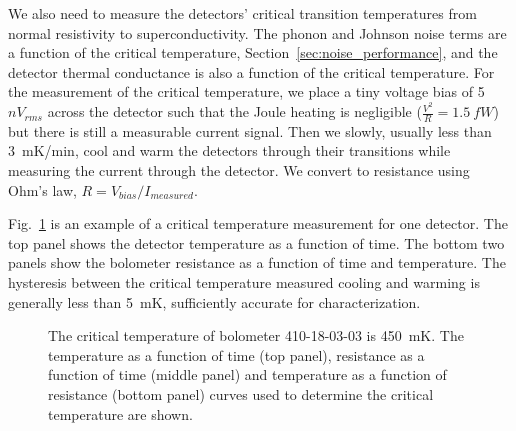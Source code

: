 We also need to measure the detectors' critical transition temperatures from normal resistivity to superconductivity. 
The phonon and Johnson noise terms are a function of the critical temperature,  Section~\ref{sec:noise_performance}, and the detector thermal conductance is also a function of the critical temperature. 
For the measurement of the critical temperature, we place a tiny voltage bias of 5~$nV_{rms}$ across the detector such that the Joule heating is negligible ($\frac{V^2}{R} = 1.5~fW$) but there is still a measurable current signal. 
Then we slowly, usually less than 3~mK/min, cool and warm the detectors through their transitions while measuring the current through the detector. We convert to resistance using Ohm's law, $R=V_{bias}/I_{measured}$.

Fig.~\ref{fig:tc_measurement} is an example of a critical temperature measurement for one detector. 
The top panel shows the detector temperature as a function of time. %
The bottom two panels show the bolometer resistance as a function of time and temperature. 
The hysteresis between the critical temperature measured cooling and warming is generally less than 5~mK, sufficiently accurate for characterization.

\begin{figure}[htbp]
\begin{center}
\caption{The critical temperature of bolometer 410-18-03-03 is 450~mK.  The temperature as a function of time (top panel), resistance as a function of time (middle panel) and temperature as a function of resistance (bottom panel) curves used to determine the critical temperature are shown. 
}
\label{fig:tc_measurement}
\end{center}
\end{figure} 

